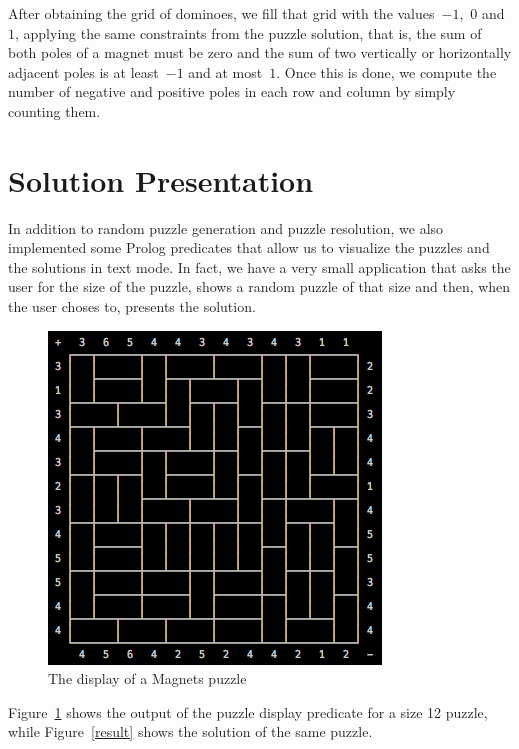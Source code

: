 \documentclass{llncs}
\begin{document}
After obtaining the grid of dominoes, we fill that grid with the values~$-1$,~$0$ and~$1$, applying the same constraints from the puzzle solution, that is, the sum of both poles of a magnet must be zero and the sum of two vertically or horizontally adjacent poles is at least~$-1$ and at most~$1$. Once this is done, we compute the number of negative and positive poles in each row and column by simply counting them.


\section{Solution Presentation} 

In addition to random puzzle generation and puzzle resolution, we also implemented some Prolog predicates that allow us to visualize the puzzles and the solutions in text mode. In fact, we have a very small application that asks the user for the size of the puzzle, shows a random puzzle of that size and then, when the user choses to, presents the solution. 

\begin{figure}[htbp]
\begin{center}
\includegraphics[scale=0.6]{puzzle.png}
\caption{The display of a Magnets puzzle}
\label{puzzle}
\end{center}
\end{figure}

Figure~\ref{puzzle} shows the output of the puzzle display predicate for a size 12 puzzle, while Figure~\ref{result} shows the solution of the same puzzle.
 
\end{document}
